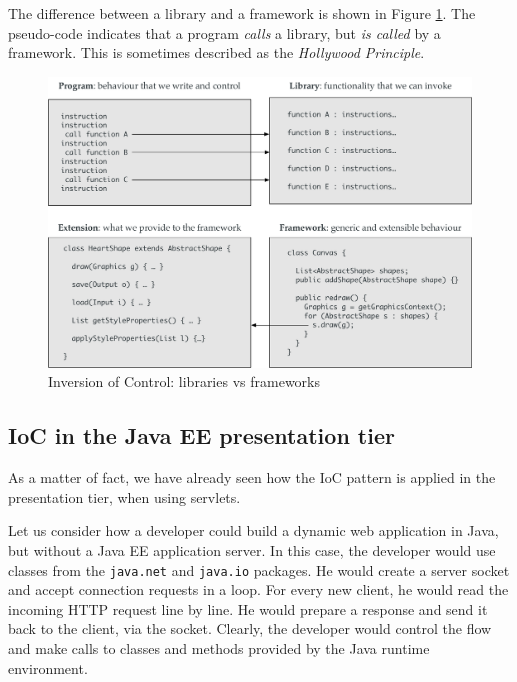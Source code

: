 The difference between a library and a framework is shown in Figure \ref{fig:library-vs-framework}. The pseudo-code indicates that a program \emph{calls} a library, but \emph{is called} by a framework. This is sometimes described as the \emph{Hollywood Principle}.

\begin{figure}[]
	\centering
    \includegraphics[width=1.0\linewidth]{Figures/frameworkVsLibrary.pdf}
	\caption{Inversion of Control: libraries vs frameworks}
  \label{fig:library-vs-framework}
\end{figure}

\subsection{IoC in the Java EE presentation tier}

As a matter of fact, we have already seen how the \ac{IoC} pattern is applied in the presentation tier, when using servlets.

Let us consider how a developer could build a dynamic web application in Java, but without a Java EE application server. In this case, the developer would use classes from the \texttt{java.net} and \texttt{java.io} packages. He would create a server socket and accept connection requests in a loop. For every new client, he would read the incoming HTTP request line by line. He would prepare a response and send it back to the client, via the socket. Clearly, the developer would control the flow and make calls to classes and methods provided by the Java runtime environment.

